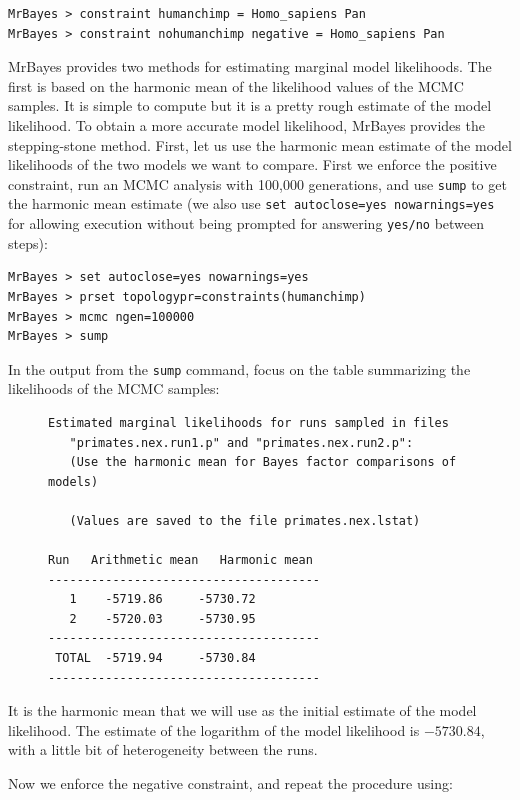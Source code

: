 \documentclass[12pt]{book}
\begin{document}
\begin{Verbatim}
MrBayes > constraint humanchimp = Homo_sapiens Pan
MrBayes > constraint nohumanchimp negative = Homo_sapiens Pan
\end{Verbatim}

MrBayes provides two methods for estimating marginal model likelihoods. The first is based on the
harmonic mean of the likelihood values of the MCMC samples. It is simple to compute but it is a
pretty rough estimate of the model likelihood. To obtain a more accurate model likelihood, MrBayes
provides the stepping-stone method. First, let us use the harmonic mean estimate of the model
likelihoods of the two models we want to compare. First we enforce the positive constraint, run an
MCMC analysis with 100,000 generations, and use \texttt{sump} to get the harmonic mean estimate (we
also use \texttt{set autoclose=yes nowarnings=yes} for allowing execution without being prompted
for answering \texttt{yes/no} between steps):

\begin{Verbatim}
MrBayes > set autoclose=yes nowarnings=yes
MrBayes > prset topologypr=constraints(humanchimp)
MrBayes > mcmc ngen=100000
MrBayes > sump
\end{Verbatim}

In the output from the \texttt{sump} command, focus on the table summarizing the likelihoods of the
MCMC samples:

\begin{figure}[H]
\centering
\begin{BVerbatim}
Estimated marginal likelihoods for runs sampled in files
   "primates.nex.run1.p" and "primates.nex.run2.p":
   (Use the harmonic mean for Bayes factor comparisons of models)

   (Values are saved to the file primates.nex.lstat)

Run   Arithmetic mean   Harmonic mean
--------------------------------------
   1    -5719.86     -5730.72
   2    -5720.03     -5730.95
--------------------------------------
 TOTAL  -5719.94     -5730.84
--------------------------------------
\end{BVerbatim}
\end{figure}

It is the harmonic mean that we will use as the initial estimate of the model likelihood. The
estimate of the logarithm of the model likelihood is $-5730.84$, with a little bit of heterogeneity
between the runs.

Now we enforce the negative constraint, and repeat the procedure using:
\end{document}
